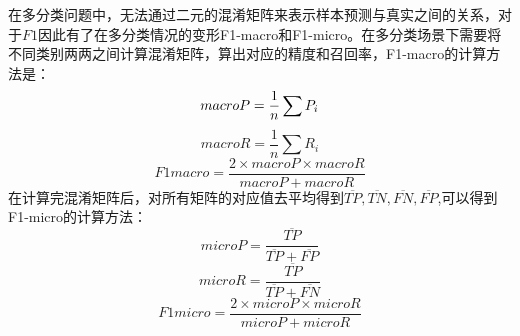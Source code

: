 在多分类问题中，无法通过二元的混淆矩阵来表示样本预测与真实之间的关系，对于$F1$因此有了在多分类情况的变形F1-macro和F1-micro。在多分类场景下需要将不同类别两两之间计算混淆矩阵，算出对应的精度和召回率，F1-macro的计算方法是：
\begin{equation}
	macro\-P = \frac{1}{n}\sum P_i
\end{equation}
\begin{equation}
macroR = \frac{1}{n}\sum R_i
\end{equation}
\begin{equation}
F1macro = \frac{2\times macroP\times macroR}{macroP+macroR}
\end{equation}
在计算完混淆矩阵后，对所有矩阵的对应值去平均得到$\overline{TP}, \overline{TN}, \overline{FN},\overline{FP}$,可以得到F1-micro的计算方法：
\begin{equation}
microP = \frac{\overline{TP}}{\overline{TP}+\overline{FP}}
\end{equation}
\begin{equation}
microR = \frac{\overline{TP}}{\overline{TP}+\overline{FN}}
\end{equation}
\begin{equation}
F1micro = \frac{2\times microP\times microR}{microP+microR}
\end{equation}

